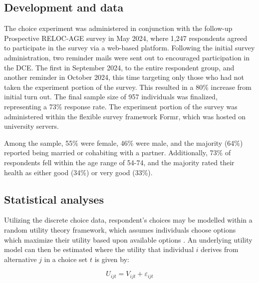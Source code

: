 \documentclass[3p,11pt ]{elsarticle}
\begin{document}
\clearpage


\subsection{Development and data}

The choice experiment was administered in conjunction with the follow-up Prospective RELOC-AGE survey in May 2024,
where 1,247 respondents agreed to participate in the survey via a web-based platform.
Following the initial survey administration, 
two reminder mails were sent out to encouraged participation in the DCE.
The first in September 2024,
to the entire respondent group,
and another reminder in October 2024,
this time targeting only those who had not taken the experiment portion of the survey.
This resulted in a 80\% increase from initial turn out.
The final sample size of 957 individuals was finalized, representing a 73\% response rate.
The experiment portion of the survey was administered within the flexible survey framework Formr,
which was hosted on university servers.



Among the sample, 55\% were female, 46\% were male, and the majority (64\%) reported being married or cohabiting with a partner. Additionally, 73\% of respondents fell within the age range of 54-74, and the majority rated their health as either good (34\%) or very good (33\%).


%






\subsection{Statistical analyses}

Utilizing the discrete choice data,
respondent's choices may be modelled within a random utility theory framework,
which assumes individuals choose options which maximize their utility based upon available options \citep{lancsarConductingDiscreteChoice2008}.
An underlying utility model can then be estimated where the utility that individual \( i \) derives from alternative \( j \) in a choice set \( t \) is given by:

\begin{equation}
U_{ijt} = V_{ijt} + \varepsilon_{ijt}
\end{equation}
\end{document}
